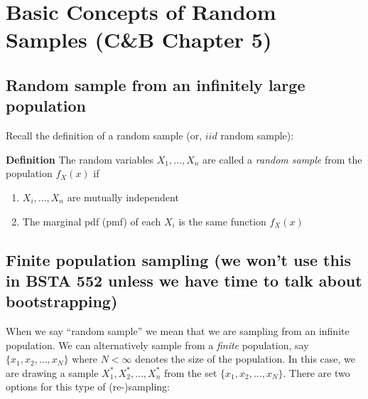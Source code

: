 \documentclass[11pt,]{article}
\newcommand{\Xndots}{X_1, \ldots, X_n}
\begin{document}
\newpage

\hypertarget{basic-concepts-of-random-samples-cb-chapter-5}{%
\section{Basic Concepts of Random Samples (C\&B Chapter
5)}\label{basic-concepts-of-random-samples-cb-chapter-5}}

\hypertarget{random-sample-from-an-infinitely-large-population}{%
\subsection{Random sample from an infinitely large
population}\label{random-sample-from-an-infinitely-large-population}}

Recall the definition of a random sample (or, \(iid\) random sample):

\textbf{Definition} The random variables \(\Xndots\) are called a
\emph{random sample} from the population \(f_X(x)\) if

\begin{enumerate}
\item $X_i, \ldots, X_n$ are mutually independent
\item The marginal pdf (pmf) of each $X_i$ is the same function $f_X(x)$
\end{enumerate}

\hypertarget{finite-population-sampling-we-wont-use-this-in-bsta-552-unless-we-have-time-to-talk-about-bootstrapping}{%
\subsection{Finite population sampling (we won't use this in BSTA 552
unless we have time to talk about
bootstrapping)}\label{finite-population-sampling-we-wont-use-this-in-bsta-552-unless-we-have-time-to-talk-about-bootstrapping}}

When we say ``random sample'' we mean that we are sampling from an
infinite population. We can alternatively sample from a \emph{finite}
population, say \(\{x_1, x_2, \ldots, x_N\}\) where \(N< \infty\)
denotes the size of the population. In this case, we are drawing a
sample \(X^*_1, X^*_2, \ldots, X^*_n\) from the set
\(\{x_1, x_2, \ldots, x_N\}\). There are two options for this type of
(re-)sampling:
\end{document}
